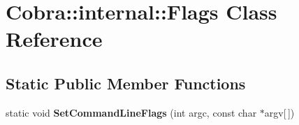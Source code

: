\hypertarget{class_cobra_1_1internal_1_1_flags}{\section{Cobra\+:\+:internal\+:\+:Flags Class Reference}
\label{class_cobra_1_1internal_1_1_flags}
}
\subsection*{Static Public Member Functions}
\begin{DoxyCompactItemize}
\item 
\hypertarget{class_cobra_1_1internal_1_1_flags_a74931598fb17cee698b27975c5feda6e}{static void {\bfseries Set\+Command\+Line\+Flags} (int argc, const char $\ast$argv\mbox{[}$\,$\mbox{]})}\label{class_cobra_1_1internal_1_1_flags_a74931598fb17cee698b27975c5feda6e}

\end{DoxyCompactItemize}

